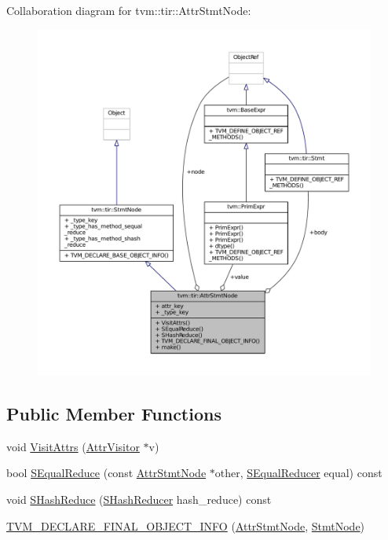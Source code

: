 Collaboration diagram for tvm\+:\+:tir\+:\+:Attr\+Stmt\+Node\+:
\nopagebreak
\begin{figure}[H]
\begin{center}
\leavevmode
\includegraphics[width=350pt]{classtvm_1_1tir_1_1AttrStmtNode__coll__graph}
\end{center}
\end{figure}
\subsection*{Public Member Functions}
\begin{DoxyCompactItemize}
\item 
void \hyperlink{classtvm_1_1tir_1_1AttrStmtNode_ab430d517a34ec9786d6e4c8a1c3ae810}{Visit\+Attrs} (\hyperlink{classtvm_1_1AttrVisitor}{Attr\+Visitor} $\ast$v)
\item 
bool \hyperlink{classtvm_1_1tir_1_1AttrStmtNode_affcfbc7f8bb3cd8b3f38dd840ab7c955}{S\+Equal\+Reduce} (const \hyperlink{classtvm_1_1tir_1_1AttrStmtNode}{Attr\+Stmt\+Node} $\ast$other, \hyperlink{classtvm_1_1SEqualReducer}{S\+Equal\+Reducer} equal) const 
\item 
void \hyperlink{classtvm_1_1tir_1_1AttrStmtNode_a4a315c8f02b1256c3cd2f430b2b02f33}{S\+Hash\+Reduce} (\hyperlink{classtvm_1_1SHashReducer}{S\+Hash\+Reducer} hash\+\_\+reduce) const 
\item 
\hyperlink{classtvm_1_1tir_1_1AttrStmtNode_ac7fd0cf94043bb78ca093ae28df24c0f}{T\+V\+M\+\_\+\+D\+E\+C\+L\+A\+R\+E\+\_\+\+F\+I\+N\+A\+L\+\_\+\+O\+B\+J\+E\+C\+T\+\_\+\+I\+N\+FO} (\hyperlink{classtvm_1_1tir_1_1AttrStmtNode}{Attr\+Stmt\+Node}, \hyperlink{classtvm_1_1tir_1_1StmtNode}{Stmt\+Node})
\end{DoxyCompactItemize}
